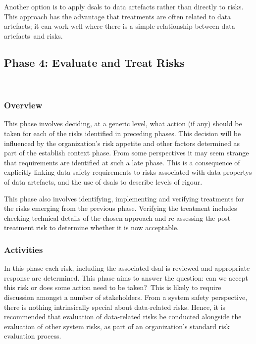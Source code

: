 Another option is to apply \glspl{dsal} to \glspl{data artefact} rather than directly to risks. This approach has the advantage that \glspl{treatment} are often related to \cbstart\glspl{data artefact}\cbend; it can work well where there is a simple relationship between \cbstart\glspl{data artefact}\cbend\ and risks.

\cbstart\subsection{Phase 4: Evaluate and Treat Risks}\cbend\
\subsubsection{Overview}
This phase involves deciding, at a generic level, what action (if any) should be taken for each of the risks identified in preceding phases. This decision will be influenced by the organization's risk appetite and other factors determined as part of the establish context phase. From some perspectives it may seem strange that requirements are identified at such a late phase. This is a consequence of explicitly linking data safety requirements to risks associated with \glspl{data property} of \glspl{data artefact}, and the use of \glspl{dsal} to describe levels of rigour. 

This phase also involves identifying, implementing and verifying \glspl{treatment} for the risks emerging from the previous phase. \cbstart Verifying the \gls{treatment} includes checking technical details of the chosen approach and re-assessing the post-\gls{treatment} risk to determine whether it is now acceptable\cbend.

\subsubsection{Activities}
\cbstart In this phase each risk, including the associated \gls{dsal} is reviewed and appropriate \gls{response} are determined. This phase aims to answer the question: can we accept this risk or does some action need to be taken?\cbend\ This is likely to require discussion amongst a number of \glspl{stakeholder}. From a system safety perspective, there is nothing intrinsically special about data-related risks. Hence, it is recommended that evaluation of data-related risks be conducted alongside the evaluation of other system risks, as part of an organization's standard risk evaluation process.

